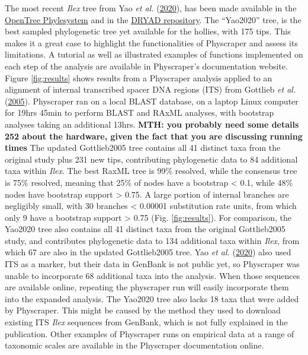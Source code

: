 \documentclass[]{article}
\begin{document}
The most recent \emph{Ilex} tree from Yao \emph{et al.} (\protect\hyperlink{ref-yao2020phylogeny}{2020}), has been made available in the \href{https://tree.opentreeoflife.org/curator/study/view/ot_1984}{OpenTree Phylesystem} and in the \href{https://datadryad.org/stash/dataset/doi:10.5061/dryad.k0p2ngf4x}{DRYAD repository}. The ``Yao2020'' tree, is the best sampled phylogenetic tree yet available for the hollies, with 175 tips.
This makes it a great case to highlight the functionalities of Physcraper and assess its limitations.
A tutorial as well as illustrated examples of functions implemented on each step of the analysis are available in Physcraper's documentation website.
Figure \ref{fig:results} shows results from a Physcraper analysis applied to an alignment of internal transcribed spacer DNA regions (ITS) from Gottlieb \emph{et al.} (\protect\hyperlink{ref-gottlieb2005molecular}{2005}). Physcraper ran on a local BLAST database, on a laptop Linux computer for 19hrs 45min to perform BLAST and RAxML analyses, with bootstrap analyses taking an additional 13hrs. \textbf{MTH: you probably need some details
252 about the hardware, given the fact that you are discussing running times}
The updated Gottlieb2005 tree contains all 41 distinct taxa from the original study plus 231 new tips, contributing phylogenetic data to 84 additional taxa within \emph{Ilex}. The best RaxML tree is 99\% resolved, while the consensus tree is 75\% resolved, meaning that 25\% of nodes have a bootstrap \textless{} 0.1, while 48\% nodes have bootstrap support \textgreater{} 0.75.
A large portion of internal branches are negligibly small, with 30 branches \textless{} 0.00001 substitution rate units, from which only 9 have a bootstrap support \textgreater{} 0.75 (Fig. \ref{fig:results}).
For comparison, the Yao2020 tree also contains all 41 distinct taxa from the original Gottlieb2005 study,
and contributes phylogenetic data to 134 additional taxa within \emph{Ilex}, from which
67 are also in the updated Gottlieb2005 tree. Yao \emph{et al.} (\protect\hyperlink{ref-yao2020phylogeny}{2020}) also used ITS as a marker, but their data in GenBank is not public yet, so Physcraper was unable to incorporate 68 additional taxa into the analysis.
When those sequences are available online, repeating the physcraper run will easily incorporate them into the expanded analysis.
The Yao2020 tree also lacks 18 taxa that were added by Physcraper.
This might be caused by the method they used to download existing ITS \emph{Ilex} sequences from GenBank, which is not fully explained in the publication.
Other examples of Physcraper runs on empirical data at a range of taxonomic scales are available in the Physcraper documentation online.
\end{document}
